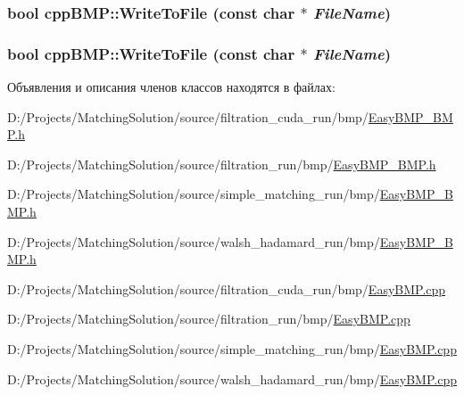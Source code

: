 \hypertarget{classcpp_b_m_p_bee4a161c6d3ad3d627b70b62735259d}{
\subsubsection[{WriteToFile}]{\setlength{\rightskip}{0pt plus 5cm}bool cppBMP::WriteToFile (const char $\ast$ {\em FileName})}}
\label{classcpp_b_m_p_bee4a161c6d3ad3d627b70b62735259d}


\hypertarget{classcpp_b_m_p_bee4a161c6d3ad3d627b70b62735259d}{
\subsubsection[{WriteToFile}]{\setlength{\rightskip}{0pt plus 5cm}bool cppBMP::WriteToFile (const char $\ast$ {\em FileName})}}
\label{classcpp_b_m_p_bee4a161c6d3ad3d627b70b62735259d}




Объявления и описания членов классов находятся в файлах:\begin{CompactItemize}
\item 
D:/Projects/MatchingSolution/source/filtration\_\-cuda\_\-run/bmp/\hyperlink{filtration__cuda__run_2bmp_2_easy_b_m_p___b_m_p_8h}{EasyBMP\_\-BMP.h}\item 
D:/Projects/MatchingSolution/source/filtration\_\-run/bmp/\hyperlink{filtration__run_2bmp_2_easy_b_m_p___b_m_p_8h}{EasyBMP\_\-BMP.h}\item 
D:/Projects/MatchingSolution/source/simple\_\-matching\_\-run/bmp/\hyperlink{simple__matching__run_2bmp_2_easy_b_m_p___b_m_p_8h}{EasyBMP\_\-BMP.h}\item 
D:/Projects/MatchingSolution/source/walsh\_\-hadamard\_\-run/bmp/\hyperlink{walsh__hadamard__run_2bmp_2_easy_b_m_p___b_m_p_8h}{EasyBMP\_\-BMP.h}\item 
D:/Projects/MatchingSolution/source/filtration\_\-cuda\_\-run/bmp/\hyperlink{filtration__cuda__run_2bmp_2_easy_b_m_p_8cpp}{EasyBMP.cpp}\item 
D:/Projects/MatchingSolution/source/filtration\_\-run/bmp/\hyperlink{filtration__run_2bmp_2_easy_b_m_p_8cpp}{EasyBMP.cpp}\item 
D:/Projects/MatchingSolution/source/simple\_\-matching\_\-run/bmp/\hyperlink{simple__matching__run_2bmp_2_easy_b_m_p_8cpp}{EasyBMP.cpp}\item 
D:/Projects/MatchingSolution/source/walsh\_\-hadamard\_\-run/bmp/\hyperlink{walsh__hadamard__run_2bmp_2_easy_b_m_p_8cpp}{EasyBMP.cpp}\end{CompactItemize}
